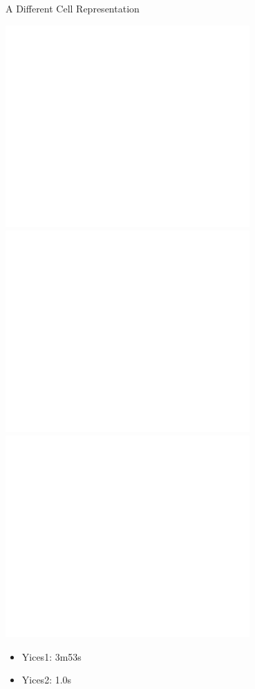 \documentclass{beamer}
\begin{document}
\begin{frame}{A Different Cell Representation}
\begin{overprint}
 \includegraphics[width=0.7\textwidth]{bitcell5}
 \includegraphics[width=0.7\textwidth]{bitcell6}
 \includegraphics[width=0.7\textwidth]{bitcell7}
\end{overprint}
\begin{itemize}
\item Yices1: 3m53s
\item Yices2: 1.0s
\end{itemize}
\end{frame}
\end{document}
